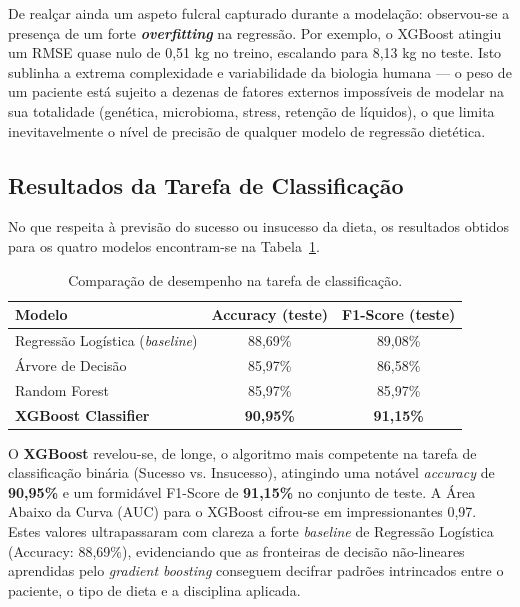 De realçar ainda um aspeto fulcral capturado durante a modelação: observou-se a presença de um forte \textbf{\textit{overfitting}} na regressão. Por exemplo, o XGBoost atingiu um RMSE quase nulo de 0,51 kg no treino, escalando para 8,13 kg no teste. Isto sublinha a extrema complexidade e variabilidade da biologia humana --- o peso de um paciente está sujeito a dezenas de fatores externos impossíveis de modelar na sua totalidade (genética, microbioma, stress, retenção de líquidos), o que limita inevitavelmente o nível de precisão de qualquer modelo de regressão dietética.

\subsection{Resultados da Tarefa de Classificação}

No que respeita à previsão do sucesso ou insucesso da dieta, os resultados obtidos para os quatro modelos encontram-se na Tabela~\ref{tab:classificacao}.

\begin{table}[h!]
\centering
\caption{Comparação de desempenho na tarefa de classificação.}
\label{tab:classificacao}
\begin{tabular}{lcc}
\hline
\textbf{Modelo} & \textbf{Accuracy (teste)} & \textbf{F1-Score (teste)} \\
\hline
Regressão Logística (\textit{baseline}) & 88,69\% & 89,08\% \\
Árvore de Decisão & 85,97\% & 86,58\% \\
Random Forest & 85,97\% & 85,97\% \\
\textbf{XGBoost Classifier} & \textbf{90,95\%} & \textbf{91,15\%} \\
\hline
\end{tabular}
\end{table}

O \textbf{XGBoost} revelou-se, de longe, o algoritmo mais competente na tarefa de classificação binária (Sucesso vs. Insucesso), atingindo uma notável \textit{accuracy} de \textbf{90,95\%} e um formidável F1-Score de \textbf{91,15\%} no conjunto de teste. A Área Abaixo da Curva (AUC) para o XGBoost cifrou-se em impressionantes 0,97. Estes valores ultrapassaram com clareza a forte \textit{baseline} de Regressão Logística (Accuracy: 88,69\%), evidenciando que as fronteiras de decisão não-lineares aprendidas pelo \textit{gradient boosting} conseguem decifrar padrões intrincados entre o paciente, o tipo de dieta e a disciplina aplicada.

